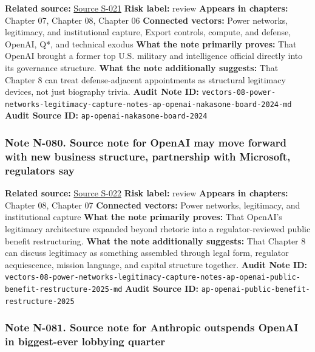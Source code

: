 \documentclass[
  american,
  11pt,
  letterpaper,
]{article}
\begin{document}
\textbf{Related source:}
\hyperref[source-s-021-openai-appoints-former-top-us-cyberwarrior-paul-nakasone-to-its-board-of-directors]{Source
S-021} \textbf{Risk label:} review \textbf{Appears in chapters:} Chapter
07, Chapter 08, Chapter 06 \textbf{Connected vectors:} Power networks,
legitimacy, and institutional capture, Export controls, compute, and
defense, OpenAI, Q*, and technical exodus \textbf{What the note
primarily proves:} That OpenAI brought a former top U.S. military and
intelligence official directly into its governance structure.
\textbf{What the note additionally suggests:} That Chapter 8 can treat
defense-adjacent appointments as structural legitimacy devices, not just
biography trivia. \textbf{Audit Note ID:}
\texttt{vectors-08-power-networks-legitimacy-capture-notes-ap-openai-nakasone-board-2024-md}
\textbf{Audit Source ID:} \texttt{ap-openai-nakasone-board-2024}

\subsubsection{Note N-080. Source note for OpenAI may move forward with
new business structure, partnership with Microsoft, regulators
say}\label{note-n-080-vectors-08-power-networks-legitimacy-capture-notes-ap-openai-public-benefit-restructure-2025-md}

\textbf{Related source:}
\hyperref[source-s-022-openai-may-move-forward-with-new-business-structure-partnership-with-microsoft-regulators-say]{Source
S-022} \textbf{Risk label:} review \textbf{Appears in chapters:} Chapter
08, Chapter 07 \textbf{Connected vectors:} Power networks, legitimacy,
and institutional capture \textbf{What the note primarily proves:} That
OpenAI's legitimacy architecture expanded beyond rhetoric into a
regulator-reviewed public benefit restructuring. \textbf{What the note
additionally suggests:} That Chapter 8 can discuss legitimacy as
something assembled through legal form, regulator acquiescence, mission
language, and capital structure together. \textbf{Audit Note ID:}
\texttt{vectors-08-power-networks-legitimacy-capture-notes-ap-openai-public-benefit-restructure-2025-md}
\textbf{Audit Source ID:}
\texttt{ap-openai-public-benefit-restructure-2025}

\subsubsection{Note N-081. Source note for Anthropic outspends OpenAI in
biggest-ever lobbying
quarter}\label{note-n-081-vectors-08-power-networks-legitimacy-capture-notes-axios-anthropic-openai-lobbying-quarter-2026-md}
\end{document}
